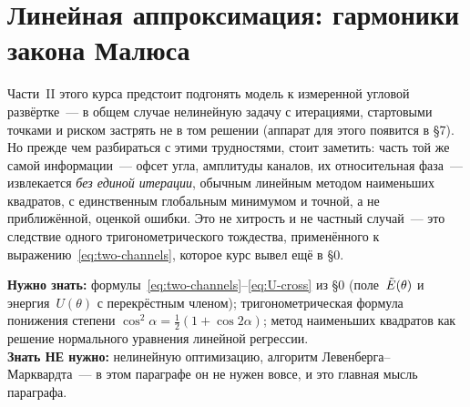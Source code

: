 %
%
\section{Линейная аппроксимация: гармоники закона Малюса}
\label{sec:linear-fit}

Части~II этого курса предстоит подгонять модель к измеренной угловой развёртке~--- в общем случае
нелинейную задачу с итерациями, стартовыми точками и риском застрять не в том решении
(аппарат для этого появится в §7). Но прежде чем разбираться с этими трудностями, стоит заметить:
часть той же самой информации~--- офсет угла, амплитуды каналов, их относительная
фаза~--- извлекается \emph{без единой итерации}, обычным линейным методом наименьших квадратов, с
единственным глобальным минимумом и точной, а не приближённой, оценкой ошибки. Это не хитрость и
не частный случай~--- это следствие одного тригонометрического тождества, применённого к
выражению~\eqref{eq:two-channels}, которое курс вывел ещё в §0.

\begin{tcolorbox}[enhanced,colback=cPanel,colframe=cGrid,boxrule=0.8pt,arc=2pt,
                  title={\bfseries\color{cAccent} Пререквизиты},coltitle=cAccent,
                  attach boxed title to top left={xshift=6pt,yshift=-2pt},
                  boxed title style={colback=cPanel,boxrule=0pt,arc=0pt},top=10pt]
\textbf{Нужно знать:} формулы~\eqref{eq:two-channels}--\eqref{eq:U-cross} из §0 (поле~$\tilde{E}(\theta)$
и энергия~$U(\theta)$ с перекрёстным членом); тригонометрическая формула понижения степени
$\cos^2\alpha=\tfrac12(1+\cos2\alpha)$; метод наименьших квадратов как решение нормального
уравнения линейной регрессии.\\[0.3em]
\textbf{Знать НЕ нужно:} нелинейную оптимизацию, алгоритм Левенберга--Марквардта~--- в этом
параграфе он не нужен вовсе, и это главная мысль параграфа.
\end{tcolorbox}

